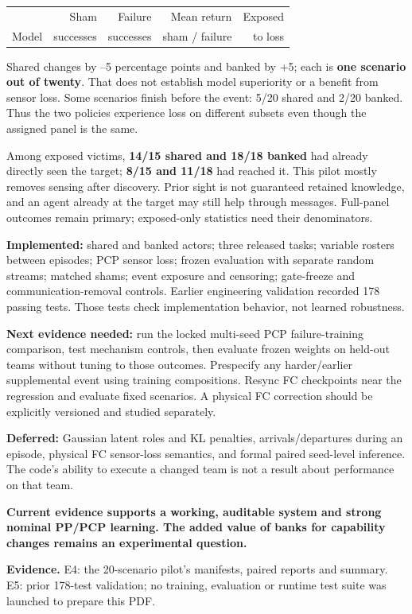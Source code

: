 \documentclass[11pt,letterpaper]{article}
\newcommand{\sub}[1]{\par\vspace{5pt}{\large\bfseries #1}\par\vspace{1pt}}
\newcommand{\takeaway}[1]{\par\vspace{5pt}\noindent\colorbox{pale}{\parbox{\dimexpr\linewidth-18pt\relax}{\vspace{5pt}\textbf{#1}\vspace{5pt}}}\par\vspace{3pt}}
\newcommand{\evidence}[1]{\vfill{\fontsize{8.4}{10.5}\selectfont\color{muted}\textbf{Evidence.} #1\par}}
\begin{document}
{\small\renewcommand{\arraystretch}{1.25}\begin{tabularx}{\linewidth}{@{}Xrrrr@{}}\toprule
 & Sham & Failure & Mean return & Exposed \\
Model & successes & successes & sham / failure & to loss \\\midrule
\bottomrule
\end{tabularx}}

Shared changes by --5 percentage points and banked by +5; each is \textbf{one scenario out of twenty}. That does not establish model superiority or a benefit from sensor loss. Some scenarios finish before the event: 5/20 shared and 2/20 banked. Thus the two policies experience loss on different subsets even though the assigned panel is the same.

Among exposed victims, \textbf{14/15 shared and 18/18 banked} had already directly seen the target; \textbf{8/15 and 11/18} had reached it. This pilot mostly removes sensing after discovery. Prior sight is not guaranteed retained knowledge, and an agent already at the target may still help through messages. Full-panel outcomes remain primary; exposed-only statistics need their denominators.

\sub{What is implemented, and what remains}
\textbf{Implemented:} shared and banked actors; three released tasks; variable rosters between episodes; PCP sensor loss; frozen evaluation with separate random streams; matched shams; event exposure and censoring; gate-freeze and communication-removal controls. Earlier engineering validation recorded 178 passing tests. Those tests check implementation behavior, not learned robustness.

\textbf{Next evidence needed:} run the locked multi-seed PCP failure-training comparison, test mechanism controls, then evaluate frozen weights on held-out teams without tuning to those outcomes. Prespecify any harder/earlier supplemental event using training compositions. Resync FC checkpoints near the regression and evaluate fixed scenarios. A physical FC correction should be explicitly versioned and studied separately.

\textbf{Deferred:} Gaussian latent roles and KL penalties, arrivals/departures during an episode, physical FC sensor-loss semantics, and formal paired seed-level inference. The code's ability to execute a changed team is not a result about performance on that team.
\takeaway{Current evidence supports a working, auditable system and strong nominal PP/PCP learning. The added value of banks for capability changes remains an experimental question.}
\evidence{E4: the 20-scenario pilot's manifests, paired reports and summary. E5: prior 178-test validation; no training, evaluation or runtime test suite was launched to prepare this PDF.}
\end{document}
